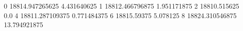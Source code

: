 0 18814.947265625 4.431640625
1 18812.466796875 1.951171875
2 18810.515625 0.0
4 18811.287109375 0.771484375
6 18815.59375 5.078125
8 18824.310546875 13.794921875
